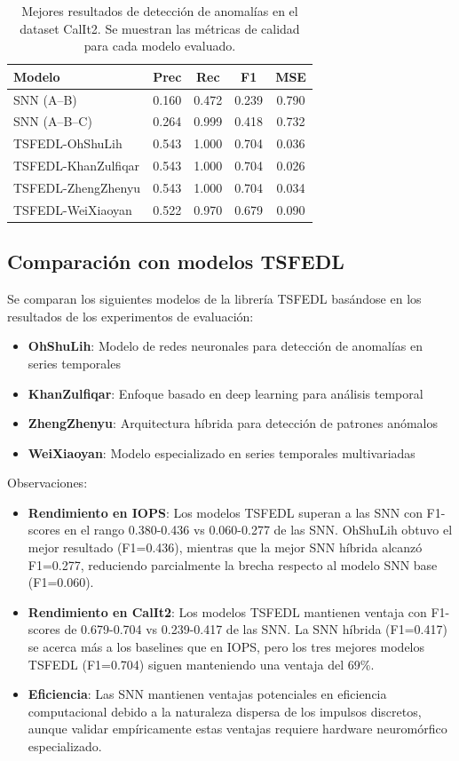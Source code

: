 \begin{table}[htbp]
\centering
\small
\begin{tabular}{lcccc}
\hline\hline
\textbf{Modelo} & \textbf{Prec} & \textbf{Rec} & \textbf{F1} & \textbf{MSE} \\
\hline
SNN (A--B) & 0.160 & 0.472 & 0.239 & 0.790 \\
SNN (A--B--C) & 0.264 & 0.999 & 0.418 & 0.732 \\
TSFEDL-OhShuLih & 0.543 & 1.000 & 0.704 & 0.036 \\
TSFEDL-KhanZulfiqar & 0.543 & 1.000 & 0.704 & 0.026 \\
TSFEDL-ZhengZhenyu & 0.543 & 1.000 & 0.704 & 0.034 \\
TSFEDL-WeiXiaoyan & 0.522 & 0.970 & 0.679 & 0.090 \\
\hline\hline
\end{tabular}
\caption{Mejores resultados de detección de anomalías en el dataset CalIt2. Se muestran las métricas de calidad para cada modelo evaluado.}
\label{tab:resultados-iops}
\end{table}

\subsection{Comparación con modelos TSFEDL}
Se comparan los siguientes modelos de la librería TSFEDL \cite{AGUILERAMARTOS2023223} basándose en los resultados de los experimentos de evaluación:
\begin{itemize}
    \item \textbf{OhShuLih}: Modelo de redes neuronales para detección de anomalías en series temporales
    \item \textbf{KhanZulfiqar}: Enfoque basado en deep learning para análisis temporal
    \item \textbf{ZhengZhenyu}: Arquitectura híbrida para detección de patrones anómalos
    \item \textbf{WeiXiaoyan}: Modelo especializado en series temporales multivariadas
\end{itemize}
Observaciones:
\begin{itemize}
    \item \textbf{Rendimiento en IOPS}: Los modelos TSFEDL superan a las SNN con F1-scores en el rango 0.380-0.436 vs 0.060-0.277 de las SNN. OhShuLih obtuvo el mejor resultado (F1=0.436), mientras que la mejor SNN híbrida alcanzó F1=0.277, reduciendo parcialmente la brecha respecto al modelo SNN base (F1=0.060).
    \item \textbf{Rendimiento en CalIt2}: Los modelos TSFEDL mantienen ventaja con F1-scores de 0.679-0.704 vs 0.239-0.417 de las SNN. La SNN híbrida (F1=0.417) se acerca más a los baselines que en IOPS, pero los tres mejores modelos TSFEDL (F1=0.704) siguen manteniendo una ventaja del 69\%.
    \item \textbf{Eficiencia}: Las SNN mantienen ventajas potenciales en eficiencia computacional debido a la naturaleza dispersa de los impulsos discretos, aunque validar empíricamente estas ventajas requiere hardware neuromórfico especializado.
\end{itemize}
